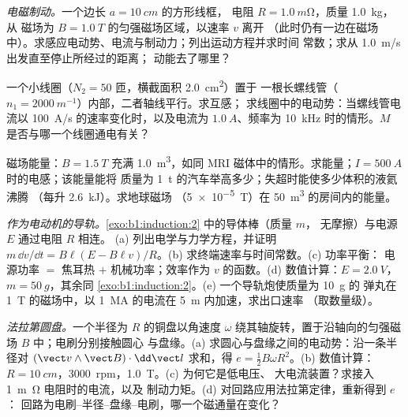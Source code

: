 \begin{exercise}[$\star\star$]\label{exo:b1:induction:7}
\emph{电磁制动。}一个边长 $a = \qty{10}{cm}$ 的方形线框，
电阻 $R = \qty{1.0}{m\ohm}$，质量 \qty{1.0}{kg}，从
磁场为 $B = \qty{1.0}{T}$ 的匀强磁场区域，以速率 $v$ 离开
（此时仍有一边在磁场中）。求感应电动势、电流与制动力；列出运动方程并求时间
常数；求从 \qty{1.0}{m/s} 出发直至停止所经过的距离；
动能去了哪里？
\end{exercise}

\begin{exercise}[$\star\star$]\label{exo:b1:induction:8}
一个小线圈（$N_2 = 50$ 匝，横截面积 \qty{2.0}{cm^2}）置于
一根长螺线管（$n_1 = \qty{2000}{m^{-1}}$）内部，二者轴线平行。求互感；
求线圈中的电动势：当螺线管电流以
\qty{100}{A/s} 的速率变化时，以及电流为 $\qty{1.0}{A}$、频率为 \qty{10}{kHz} 时的情形。$M$
是否与哪一个线圈通电有关？
\end{exercise}

\begin{exercise}[$\star\star$]\label{exo:b1:induction:9}
磁场能量：$B = \qty{1.5}{T}$ 充满 \qty{1.0}{m^3}，如同 MRI
磁体中的情形。求能量；$I = \qty{500}{A}$ 时的电感；该能量能将
质量为 \qty{1}{t} 的汽车举高多少；失超时能使多少体积的液氦沸腾
（每升 \qty{2.6}{kJ}）。求地球磁场
（\qty{5e-5}{T}）在 \qty{50}{m^3} 的房间内的能量。
\end{exercise}

\begin{exercise}[$\star\star\star$]\label{exo:b1:induction:10}
\emph{作为电动机的导轨。}\cref{exo:b1:induction:2} 中的导体棒（质量 $m$，
无摩擦）与电源 $E$ 通过电阻 $R$ 相连。
(a) 列出电学与力学方程，并证明 $m\,\dd v/\dd t = B\ell(E -
B\ell v)/R$。(b) 求终端速率与时间常数。(c) 功率平衡：
电源功率 $=$ 焦耳热 $+$ 机械功率；效率作为
$v$ 的函数。(d) 数值计算：$E = \qty{2.0}{V}$，$m = \qty{50}{g}$，其余同
\cref{exo:b1:induction:2}。(e) 一个导轨炮使质量为 \qty{10}{g} 的
弹丸在 \qty{1}{T} 的磁场中，以 \qty{1}{MA} 的电流在 \qty{5}{m} 内加速，求出口速率
（取数量级）。
\end{exercise}

\begin{exercise}[$\star\star\star$]\label{exo:b1:induction:11}
\emph{法拉第圆盘。}一个半径为 $R$ 的铜盘以角速度 $\omega$
绕其轴旋转，置于沿轴向的匀强磁场 $B$ 中；电刷分别接触圆心
与盘缘。(a) 求圆心与盘缘之间的电动势：沿一条半径对 $(\vect v\wedge
\vect B)\cdot\dd\vect l$ 求和，得 $e = \tfrac12B\omega R^2$。(b) 数值计算：
$R = \qty{10}{cm}$，\qty{3000}{rpm}，\qty{1.0}{T}。(c) 为何它是低电压、
大电流装置？求接入 \qty{1}{m\ohm} 电阻时的电流，以及
制动力矩。(d) 对回路应用法拉第定律，重新得到 $e$：
回路为电刷–半径–盘缘–电刷，哪一个磁通量在变化？
\end{exercise}

